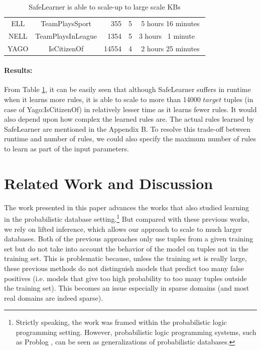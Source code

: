 \documentclass[akbc,twoside,11pt]{article}
\newcommand{\guy}[1]{\textcolor{red}{G: {#1}}}
\newcommand{\algorithmname}{SafeLearner\xspace}
\begin{document}
\begin{table}[H]
\begin{tabular}{|c|c|c|c|c|}
ELL & TeamPlaysSport		& \ \ 355 & 5 & 5 hours 16 minutes \\
NELL & TeamPlaysInLeague	&\ 1354 & 5 & 3 hours \ 1 minute\ \ \\
YAGO & IsCitizenOf          &14554 & 4 & 2 hours 25 minutes \\
\hline
\end{tabular}
\caption{\algorithmname is able to scale-up to large scale KBs}\label{table:scaleup}
\end{table}

\paragraph{Results:} 
From Table \ref{table:scaleup}, it can be easily seen that although \algorithmname suffers in runtime when it learns more rules, it is able to scale to more than 14000 $target$ tuples (in case of Yago:IsCitizenOf) in relatively lesser time as it learns fewer rules. It would also depend upon how complex the learned rules are. The actual rules learned by \algorithmname are mentioned in the Appendix B. To resolve this trade-off between runtime and number of rules, we could also specify the maximum number of rules to learn as part of the input parameters.

\section{Related Work and Discussion}
\label{sec:related}
The work presented in this paper advances the works \cite{DBLP:conf/ijcai/RaedtDTBV15,theobald_learning} that also studied learning in the probabilistic database setting.\footnote{Strictly speaking, the work \cite{DBLP:conf/ijcai/RaedtDTBV15} was framed within the probabilistic logic programming setting. However, probabilistic logic programming systems, such as Problog \cite{fierens2015inference}, can be seen as generalizations of probabilistic databases.} 
But compared with these previous works, we rely on lifted inference, which allows our approach to scale to much larger databases. %
Both of the previous approaches only use tuples from a given training set but do not take into account the behavior of the model on tuples not in the training set. 
This is problematic %
because, unless the training set is really large, these previous methods do not distinguish models that predict too many false positives (i.e. models that give too high probability to too many tuples outside the training set). This becomes an issue especially in sparse domains (and most real domains are indeed sparse).
\end{document}

